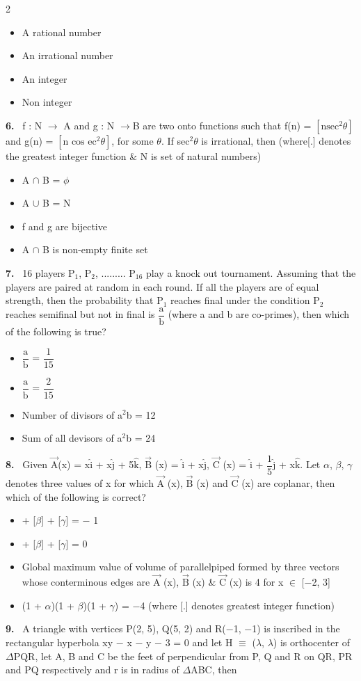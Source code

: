 \documentclass[10pt]{extarticle}
\newcommand{\qn}[1]{\par\smallskip\noindent\textbf{#1.}~}
\newenvironment{qoptions}{\begin{itemize}[leftmargin=1.8em,itemsep=1pt,topsep=2pt,label={}]}{\end{itemize}}
\newcommand{\opt}[2]{\item[(#1)] #2}
\begin{document}
\begin{multicols}{2}
\begin{qoptions}
\opt{A}{A rational number}
\opt{B}{An irrational number}
\opt{C}{An integer}
\opt{D}{Non integer}
\end{qoptions}
\qn{6} f : N $\longrightarrow$ A and g : N $\longrightarrow$B are two onto functions such that f(n) = $\left[\text{nsec}^2\theta\right]$ and g(n) = $\left[\text{n cos ec}^2\theta\right]$, for some $\theta$. If sec$^2\theta$ is irrational, then (where[.] denotes the greatest integer function \& N is set of natural numbers)
\begin{qoptions}
\opt{A}{A $\cap$ B = $\phi$}
\opt{B}{A $\cup$ B = N}
\opt{C}{f and g are bijective}
\opt{D}{A $\cap$ B is non-empty finite set}
\end{qoptions}
\qn{7} 16 players P$_1$, P$_2$, ......... P$_{16}$ play a knock out tournament. Assuming that the players are paired at random in each round. If all the players are of equal strength, then the probability that P$_1$ reaches final under the condition P$_2$ reaches semifinal but not in final is $\dfrac{\text{a}}{\text{b}}$ (where a and b are co-primes), then which of the following is true?
\begin{qoptions}
\opt{A}{$\dfrac{\text{a}}{\text{b}}$ = $\dfrac{1}{15}$}
\opt{B}{$\dfrac{\text{a}}{\text{b}}$ = $\dfrac{2}{15}$}
\opt{C}{Number of divisors of a$^2$b = 12}
\opt{D}{Sum of all devisors of a$^2$b = 24}
\end{qoptions}
\qn{8} Given $\overrightarrow{\text{A}}$(x) = x$\hat{\text{i}}$ + x$\hat{\text{j}}$ + 5$\hat{\text{k}}$, $\overrightarrow{\text{B}}$ (x) = $\hat{\text{i}}$ + x$\hat{\text{j}}$, $\overrightarrow{\text{C}}$ (x) = $\hat{\text{i}}$ + $\dfrac{1}{5}\hat{\text{j}}$ + x$\hat{\text{k}}$. Let $\alpha$, $\beta$, $\gamma$ denotes three values of x for which $\overrightarrow{\text{A}}$ (x), $\overrightarrow{\text{B}}$ (x) and $\overrightarrow{\text{C}}$ (x) are coplanar, then which of the following is correct?
\begin{qoptions}
\opt{A}{[$\alpha$] + [$\beta$] + [$\gamma$] = $-$ 1}
\opt{B}{[$\alpha$] + [$\beta$] + [$\gamma$] = 0}
\opt{C}{Global maximum value of volume of parallelpiped formed by three vectors whose conterminous edges are $\overrightarrow{\text{A}}$ (x), $\overrightarrow{\text{B}}$ (x) \& $\overrightarrow{\text{C}}$ (x) is 4 for x $\in$ [$-$2, 3]}
\opt{D}{(1 + $\alpha$)(1 + $\beta$)(1 + $\gamma$) = $-$4 (where [.] denotes greatest integer function)}
\end{qoptions}
\qn{9} A triangle with vertices P(2, 5), Q(5, 2) and R($-$1, $-$1) is inscribed in the rectangular hyperbola xy $-$ x $-$ y $-$ 3 = 0 and let H $\equiv$ ($\lambda$, $\lambda$) is orthocenter of $\Delta$PQR, let A, B and C be the feet of perpendicular from P, Q and R on QR, PR and PQ respectively and r is in radius of $\Delta$ABC, then

\end{multicols}
\end{document}
